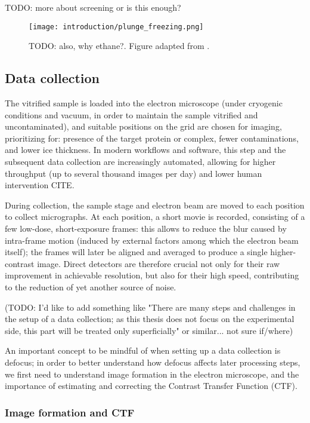TODO: more about screening or is this enough?

\begin{figure}[ht]
    \centering
    \texttt{[image: introduction/plunge\_freezing.png]}
    \caption[Vitrification via plunge freezing]{TODO: also, why ethane?. Figure adapted from \citet{chungNobelPrizeChemistry2017}.}
    \label{fig:plunge_freezing}
\end{figure}

\subsection{Data collection}
The vitrified sample is loaded into the electron microscope (under cryogenic conditions and vacuum, in order to maintain the sample vitrified and uncontaminated), and suitable positions on the grid are chosen for imaging, prioritizing for: presence of the target protein or complex, fewer contaminations, and lower ice thickness.
In modern workflows and software, this step and the subsequent data collection are increasingly automated, allowing for higher throughput (up to several thousand images per day) and lower human intervention CITE.

During collection, the sample stage and electron beam are moved to each position to collect micrographs.
At each position, a short movie is recorded, consisting of a few low-dose, short-exposure frames: this allows to reduce the blur caused by intra-frame motion (induced by external factors among which the electron beam itself); the frames will later be aligned and averaged to produce a single higher-contrast image.
Direct detectors are therefore crucial not only for their raw improvement in achievable resolution, but also for their high speed, contributing to the reduction of yet another source of noise.

(TODO: I'd like to add something like "There are many steps and challenges in the setup of a data collection; as this thesis does not focus on the experimental side, this part will be treated only superficially" or similar... not sure if/where)

An important concept to be mindful of when setting up a data collection is defocus; in order to better understand how defocus affects later processing steps, we first need to understand image formation in the electron microscope, and the importance of estimating and correcting the Contrast Transfer Function (CTF).

\subsubsection{Image formation and CTF}

